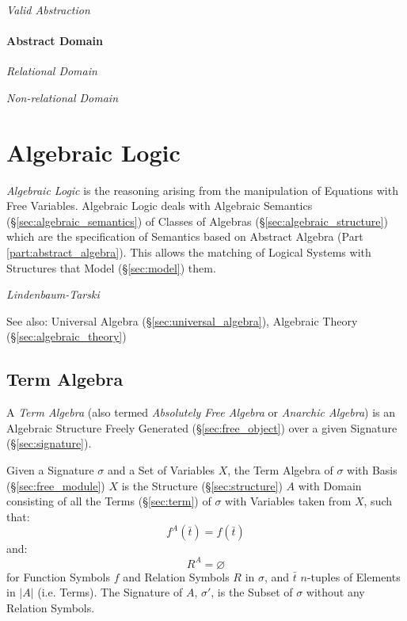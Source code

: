 \emph{Valid Abstraction}



\paragraph{Abstract Domain}\label{sec:abstract_domain}\hfill

\emph{Relational Domain}

\emph{Non-relational Domain}



\section{Algebraic Logic}\label{sec:algebraic_logic}

\emph{Algebraic Logic} is the reasoning arising from the manipulation
of Equations with Free Variables. Algebraic Logic deals with Algebraic
Semantics (\S\ref{sec:algebraic_semantics}) of Classes of Algebras
(\S\ref{sec:algebraic_structure}) which are the specification of
Semantics based on Abstract Algebra (Part
\ref{part:abstract_algebra}). This allows the matching of Logical
Systems with Structures that Model (\S\ref{sec:model}) them.

\emph{Lindenbaum-Tarski}

\fist See also: Universal Algebra
(\S\ref{sec:universal_algebra}), Algebraic Theory
(\S\ref{sec:algebraic_theory})



\subsection{Term Algebra}\label{sec:term_algebra}

A \emph{Term Algebra} (also termed \emph{Absolutely Free Algebra} or
\emph{Anarchic Algebra}) is an Algebraic Structure Freely Generated
(\S\ref{sec:free_object}) over a given Signature
(\S\ref{sec:signature}).

Given a Signature $\sigma$ and a Set of Variables $X$, the Term
Algebra of $\sigma$ with Basis (\S\ref{sec:free_module}) $X$ is the
Structure (\S\ref{sec:structure}) $A$ with Domain consisting of all
the Terms (\S\ref{sec:term}) of $\sigma$ with Variables taken from
$X$, such that:
\[
  f^A(\bar{t}) = f(\bar{t})
\] and: \[
  R^A = \varnothing
\]
for Function Symbols $f$ and Relation Symbols $R$ in $\sigma$, and
$\bar{t}$ $n$-tuples of Elements in $|A|$ (i.e. Terms). The Signature
of $A$, $\sigma'$, is the Subset of $\sigma$ without any Relation
Symbols.

